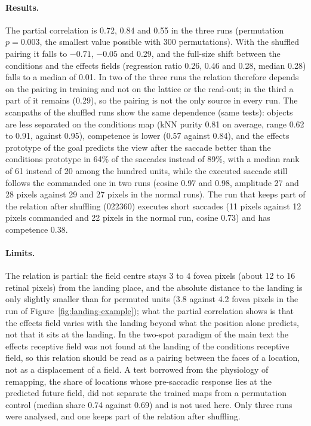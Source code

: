 \documentclass[14pt]{article}
\begin{document}
\paragraph{Results.}
The partial correlation is 0.72, 0.84 and 0.55 in the three runs (permutation $p=0.003$, the smallest value possible with 300 permutations).
With the shuffled pairing it falls to $-0.71$, $-0.05$ and 0.29, and the full-size shift between the conditions and the effects fields (regression ratio 0.26, 0.46 and 0.28, median 0.28) falls to a median of 0.01.
In two of the three runs the relation therefore depends on the pairing in training and not on the lattice or the read-out; in the third a part of it remains (0.29), so the pairing is not the only source in every run.
The scanpaths of the shuffled runs show the same dependence (same tests): objects are less separated on the conditions map (kNN purity 0.81 on average, range 0.62 to 0.91, against 0.95), competence is lower (0.57 against 0.84), and the effects prototype of the goal predicts the view after the saccade better than the conditions prototype in 64\% of the saccades instead of 89\%, with a median rank of 61 instead of 20 among the hundred units, while the executed saccade still follows the commanded one in two runs (cosine 0.97 and 0.98, amplitude 27 and 28 pixels against 29 and 27 pixels in the normal runs).
The run that keeps part of the relation after shuffling (022360) executes short saccades (11 pixels against 12 pixels commanded and 22 pixels in the normal run, cosine 0.73) and has competence 0.38.

\paragraph{Limits.}
The relation is partial: the field centre stays 3 to 4 fovea pixels (about 12 to 16 retinal pixels) from the landing place, and the absolute distance to the landing is only slightly smaller than for permuted units (3.8 against 4.2 fovea pixels in the run of Figure~\ref{fig:landing-example}); what the partial correlation shows is that the effects field varies with the landing beyond what the position alone predicts, not that it sits at the landing.
In the two-spot paradigm of the main text the effects receptive field was not found at the landing of the conditions receptive field, so this relation should be read as a pairing between the faces of a location, not as a displacement of a field.
A test borrowed from the physiology of remapping, the share of locations whose pre-saccadic response lies at the predicted future field, did not separate the trained maps from a permutation control (median share 0.74 against 0.69) and is not used here.
Only three runs were analysed, and one keeps part of the relation after shuffling.
\end{document}
